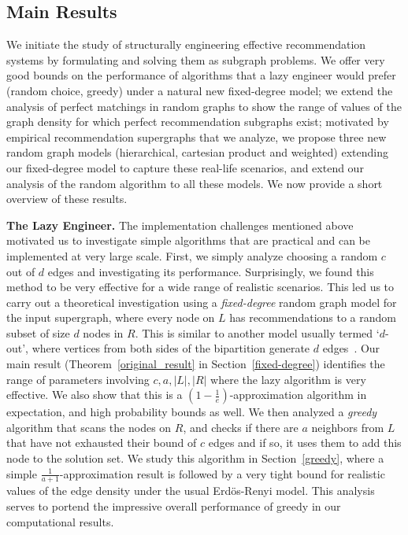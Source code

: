 \subsection{Main Results}
We initiate the study of structurally engineering effective
recommendation systems by formulating and solving them as subgraph
problems. We offer very good bounds on the performance of algorithms
that a lazy engineer would prefer (random choice, greedy) under a
natural new fixed-degree model; we extend the analysis of perfect
matchings in random graphs to show the range of values of the graph
density for which perfect recommendation subgraphs exist; motivated by
empirical recommendation supergraphs that we analyze, we propose three
new random graph models (hierarchical, cartesian product and weighted)
extending our fixed-degree model to capture these real-life scenarios,
and extend our analysis of the random algorithm to all these
models. We now provide a short overview of these results.

\noindent
{\bf The Lazy Engineer.} The implementation challenges mentioned above
motivated us to investigate simple algorithms that are practical and can
be implemented at very large scale. First, we simply analyze choosing a random
$c$ out of $d$ edges and investigating its performance.  Surprisingly,
we found this method to be very effective for a wide range of
realistic scenarios. This led us to carry out a theoretical
investigation using a {\em fixed-degree} random graph model for the
input supergraph, where every node on $L$ has recommendations to a
random subset of size $d$ nodes in $R$.  This is similar to another
model usually termed `$d$-out', where vertices from both sides of the
bipartition generate $d$ edges~\cite{FriezePittel2004}. Our main
result (Theorem~\ref{original_result} in Section~\ref{fixed-degree})
identifies the range of parameters involving $c,a,|L|, |R|$ where the
lazy algorithm is very effective. We also show that this is a
$(1-\frac1e)$-approximation algorithm in expectation, and high
probability bounds as well.  We then analyzed a {\em greedy} algorithm
that scans the nodes on $R$, and checks
if there are $a$ neighbors from $L$ that have not exhausted their
bound of $c$ edges and if so, it uses them to add
this node to the solution set. We study this algorithm in
Section~\ref{greedy}, where a simple $\frac{1}{a+1}$-approximation
result is followed by a very tight bound for realistic values of the
edge density under the usual Erd\"os-Renyi
model\cite{ErdosRenyi59}. This analysis serves to portend the
impressive overall performance of greedy in our computational
results. \vs

